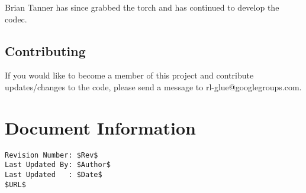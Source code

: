 \documentclass[11pt]{article}
\begin{document}
Brian Tanner has since grabbed the torch and has continued to develop the codec.

\subsection{Contributing}
If you would like to become a member of this project and contribute updates/changes to the code, please send a message to rl-glue@googlegroups.com.


\section*{Document Information}
\begin{verbatim}
Revision Number: $Rev$
Last Updated By: $Author$
Last Updated   : $Date$
$URL$
\end{verbatim}
\end{document}
